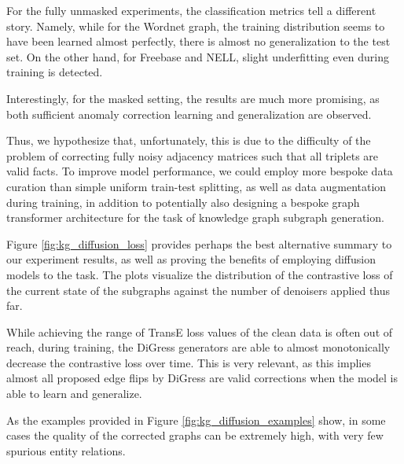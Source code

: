 For the fully unmasked experiments, the classification metrics tell a different story. Namely, while for the Wordnet graph, the training distribution seems to have been learned almost perfectly, there is almost no generalization to the test set. On the other hand, for Freebase and NELL, slight underfitting even during training is detected. 

Interestingly, for the masked setting, the results are much more promising, as both sufficient anomaly correction learning and generalization are observed. 

Thus, we hypothesize that, unfortunately, this is due to the difficulty of the problem of correcting fully noisy adjacency matrices such that all triplets are valid facts. To improve model performance, we could employ more bespoke data curation than simple uniform train-test splitting, as well as data augmentation during training, in addition to potentially also designing a bespoke graph transformer architecture for the task of knowledge graph subgraph generation.

Figure \ref{fig:kg_diffusion_loss} provides perhaps the best alternative summary to our experiment results, as well as proving the benefits of employing diffusion models to the task. The plots visualize the distribution of the contrastive loss of the current state of the subgraphs against the number of denoisers applied thus far. 

While achieving the range of TransE loss values of the clean data is often out of reach, during training, the DiGress generators are able to almost monotonically decrease the contrastive loss over time. This is very relevant, as this implies almost all proposed edge flips by DiGress are valid corrections when the model is able to learn and generalize. 

As the examples provided in Figure \ref{fig:kg_diffusion_examples} show, in some cases the quality of the corrected graphs can be extremely high, with very few spurious entity relations.

